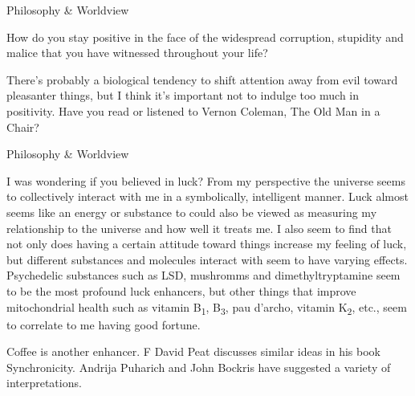 \documentclass[11pt,oneside,openany,extrafontsizes]{memoir}
\begin{document}
\begin{qaexchange}{Philosophy \& Worldview}

    \begin{question}
        How do you stay positive in the face of the widespread corruption, stupidity and malice that you have witnessed throughout your life?
    \end{question}

    \begin{answer}
      There's probably a biological tendency to shift attention away from evil toward pleasanter things, but I think it's important not to indulge too much in positivity. Have you read or listened to Vernon Coleman, The Old Man in a Chair?
    \end{answer}
\end{qaexchange}

\begin{qaexchange}{Philosophy \& Worldview}

    \begin{question}
        I was wondering if you believed in luck? From my perspective the universe seems to collectively interact with me in a symbolically, intelligent manner. Luck almost seems like an energy or substance to could also be viewed as measuring my relationship to the universe and how well it treats me. I also seem to find that not only does having a certain attitude toward things increase my feeling of luck, but different substances and molecules interact with seem to have varying effects. Psychedelic substances such as LSD, mushromms and dimethyltryptamine seem to be the most profound luck enhancers, but other things that improve mitochondrial health such as vitamin B\textsubscript{1}, B\textsubscript{3}, pau d'archo, vitamin K\textsubscript{2}, etc., seem to correlate to me having good fortune.
    \end{question}

    \begin{answer}
      Coffee is another enhancer. F David Peat discusses similar ideas in his book Synchronicity. Andrija Puharich and John Bockris have suggested a variety of interpretations.
    \end{answer}
\end{qaexchange}
\end{document}
